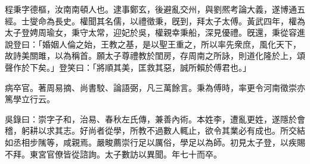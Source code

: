 
\begin{pinyinscope}
程秉字德樞，汝南南頓人也。逮事鄭玄，後避亂交州，與劉熈考論大義，遂博通五經。士燮命為長史。權聞其名儒，以禮徵秉，旣到，拜太子太傅。黃武四年，權為太子登娉周瑜女，秉守太常，迎妃於吳，權親幸秉船，深見優禮。旣還，秉從容進說登曰：「婚姻人倫之始，王教之基，是以聖王重之，所以率先衆庶，風化天下，故詩美關雎，以為稱首。願太子尊禮教於閨房，存周南之所詠，則道化隆於上，頌聲作於下矣。」登笑曰：「將順其美，匡救其惡，誠所賴於傅君也。」

病卒官。著周易摘、尚書駮、論語弼，凡三萬餘言。秉為傅時，率更令河南徵崇亦篤學立行云。

吳錄曰：崇字子和，治易、春秋左氏傳，兼善內術。本姓李，遭亂更姓，遂隱於會稽，躬耕以求其志。好尚者從學，所教不過數人輒止，欲令其業必有成也。所交結如丞相步隲等，咸親焉。嚴畯薦崇行足以厲俗，學足以為師。初見太子登，以疾賜不拜。東宮官僚皆從諮詢。太子數訪以異聞。年七十而卒。


\end{pinyinscope}